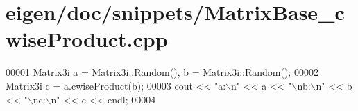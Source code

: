 \hypertarget{eigen_2doc_2snippets_2_matrix_base__cwise_product_8cpp_source}{}\section{eigen/doc/snippets/\+Matrix\+Base\+\_\+cwise\+Product.cpp}
\label{eigen_2doc_2snippets_2_matrix_base__cwise_product_8cpp_source}

\begin{DoxyCode}
00001 Matrix3i a = Matrix3i::Random(), b = Matrix3i::Random();
00002 Matrix3i c = a.cwiseProduct(b);
00003 cout << \textcolor{stringliteral}{"a:\(\backslash\)n"} << a << \textcolor{stringliteral}{"\(\backslash\)nb:\(\backslash\)n"} << b << \textcolor{stringliteral}{"\(\backslash\)nc:\(\backslash\)n"} << c << endl;
00004 
\end{DoxyCode}
